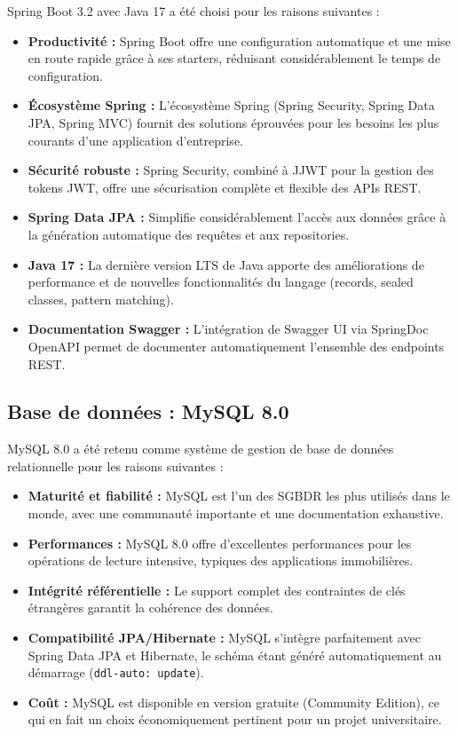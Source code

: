 \documentclass[a4paper,12pt]{report}
\begin{document}
Spring Boot 3.2 avec Java 17 a été choisi pour les raisons suivantes :

\begin{itemize}
    \item \textbf{Productivité :} Spring Boot offre une configuration automatique et une mise en route rapide grâce à ses starters, réduisant considérablement le temps de configuration.
    \item \textbf{Écosystème Spring :} L'écosystème Spring (Spring Security, Spring Data JPA, Spring MVC) fournit des solutions éprouvées pour les besoins les plus courants d'une application d'entreprise.
    \item \textbf{Sécurité robuste :} Spring Security, combiné à JJWT pour la gestion des tokens JWT, offre une sécurisation complète et flexible des APIs REST.
    \item \textbf{Spring Data JPA :} Simplifie considérablement l'accès aux données grâce à la génération automatique des requêtes et aux repositories.
    \item \textbf{Java 17 :} La dernière version LTS de Java apporte des améliorations de performance et de nouvelles fonctionnalités du langage (records, sealed classes, pattern matching).
    \item \textbf{Documentation Swagger :} L'intégration de Swagger UI via SpringDoc OpenAPI permet de documenter automatiquement l'ensemble des endpoints REST.
\end{itemize}

\subsection{Base de données : MySQL 8.0}

MySQL 8.0 a été retenu comme système de gestion de base de données relationnelle pour les raisons suivantes :

\begin{itemize}
    \item \textbf{Maturité et fiabilité :} MySQL est l'un des SGBDR les plus utilisés dans le monde, avec une communauté importante et une documentation exhaustive.
    \item \textbf{Performances :} MySQL 8.0 offre d'excellentes performances pour les opérations de lecture intensive, typiques des applications immobilières.
    \item \textbf{Intégrité référentielle :} Le support complet des contraintes de clés étrangères garantit la cohérence des données.
    \item \textbf{Compatibilité JPA/Hibernate :} MySQL s'intègre parfaitement avec Spring Data JPA et Hibernate, le schéma étant généré automatiquement au démarrage (\texttt{ddl-auto: update}).
    \item \textbf{Coût :} MySQL est disponible en version gratuite (Community Edition), ce qui en fait un choix économiquement pertinent pour un projet universitaire.
\end{itemize}
\end{document}
